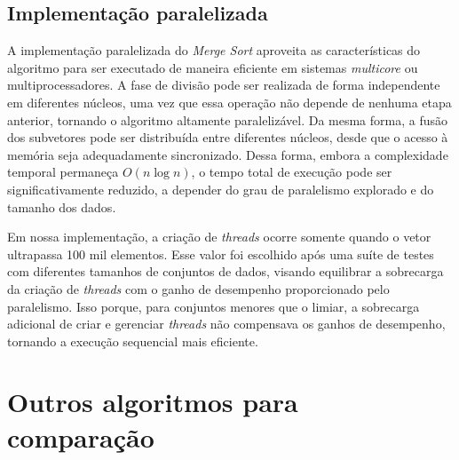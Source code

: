 \documentclass[12pt]{article}
\begin{document}
\subsection{Implementação paralelizada}\label{paralelizada}

A implementação paralelizada do \textit{Merge Sort} aproveita as características do algoritmo para ser executado de maneira eficiente em sistemas \textit{multicore} ou multiprocessadores. A fase de divisão pode ser realizada de forma independente em diferentes núcleos, uma vez que essa operação não depende de nenhuma etapa anterior, tornando o algoritmo altamente paralelizável. Da mesma forma, a fusão dos subvetores pode ser distribuída entre diferentes núcleos, desde que o acesso à memória seja adequadamente sincronizado. Dessa forma, embora a complexidade temporal permaneça $O(n\log{n})$, o tempo total de execução pode ser significativamente reduzido, a depender do grau de paralelismo explorado e do tamanho dos dados.

Em nossa implementação, a criação de \textit{threads} ocorre somente quando o vetor ultrapassa 100 mil elementos. Esse valor foi escolhido após uma suíte de testes com diferentes tamanhos de conjuntos de dados, visando equilibrar a sobrecarga da criação de \textit{threads} com o ganho de desempenho proporcionado pelo paralelismo. Isso porque, para conjuntos menores que o limiar, a sobrecarga adicional de criar e gerenciar \textit{threads} não compensava os ganhos de desempenho, tornando a execução sequencial mais eficiente. 



   
\section{Outros algoritmos para comparação}
\end{document}
